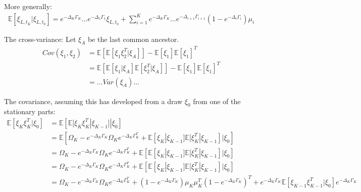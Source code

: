 \documentclass[11pt,a4paper]{article}
\begin{document}
More generally:
\begin{align*}
    \mathbb{E}[\xi_{L,t_{K}} | \xi_{L,t_{0}}] = e^{-\Delta_K\Gamma_K} \dots e^{-\Delta_1\Gamma_1} \xi_{L,t_{0}} + \sum_{i=1}^K e^{-\Delta_K\Gamma_K} \dots e^{-\Delta_{i+1}\Gamma_{i+1}} (1-e^{-\Delta_{i}\Gamma_{i}}) \mu_i
\end{align*}


The cross-variance: Let $\xi_A$ be the last common ancestor.
\begin{align*}
    Cov(\xi_{1}, \xi_2) &= \mathbb{E}[ \mathbb{E}[\xi_1 \xi_2^T | \xi_A]] - \mathbb{E}[\xi_1] \mathbb{E}[\xi_1]^T \\
    &= \mathbb{E}[ \mathbb{E}[\xi_1| \xi_A] \mathbb{E}[\xi_2^T | \xi_A]] - \mathbb{E}[\xi_1] \mathbb{E}[\xi_1]^T  \\
    &= ... Var(\xi_A) ...
\end{align*}

The covariance, assuming this has developed from a draw $\xi_0$ from one of the stationary parts:
\begin{align*}
    \mathbb{E}[\xi_K \xi_K^T | \xi_0] &= \mathbb{E}\left[ \mathbb{E}[\xi_K \xi_K^T| \xi_{K-1}] | \xi_0\right] \\
    &=\mathbb{E}\left[  \Omega_K - e^{-\Delta_K \Gamma_K} \Omega_K e^{-\Delta_K \Gamma_K^T}  +  \mathbb{E}[\xi_K| \xi_{K-1}] \mathbb{E}[\xi_K^T| \xi_{K-1}]      | \xi_0\right] \\
    &=  \Omega_K - e^{-\Delta_K \Gamma_K} \Omega_K e^{-\Delta_K \Gamma_K^T}  +  \mathbb{E}\left[\mathbb{E}[\xi_K| \xi_{K-1}] \mathbb{E}[\xi_K^T| \xi_{K-1}]      | \xi_0\right] \\
    &=  \Omega_K - e^{-\Delta_K \Gamma_K} \Omega_K e^{-\Delta_K \Gamma_K^T}  +  \mathbb{E}\left[\mathbb{E}[\xi_K| \xi_{K-1}] \mathbb{E}[\xi_K^T| \xi_{K-1}]      | \xi_0\right] \\
    &=  \Omega_K - e^{-\Delta_K \Gamma_K} \Omega_K e^{-\Delta_K \Gamma_K^T}  + (1-e^{-\Delta_K \Gamma_K})\mu_K \mu_K^T (1-e^{-\Delta_K \Gamma_K})^T + e^{-\Delta_K\Gamma_K} \mathbb{E}\left[\xi_{K-1} \xi_{K-1}^T| \xi_0\right] e^{-\Delta_K\Gamma_K} \\
\end{align*}
\end{document}
